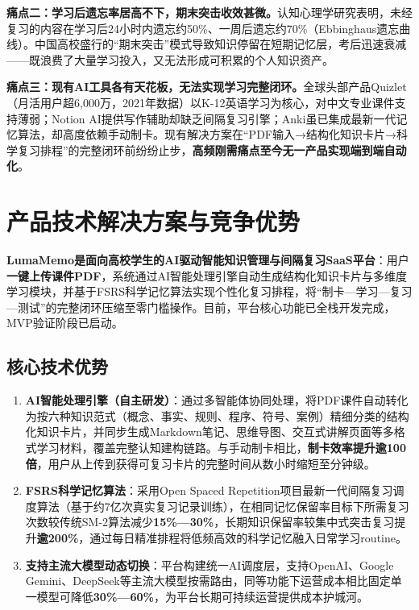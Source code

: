 \textbf{痛点二：学习后遗忘率居高不下，期末突击收效甚微。}认知心理学研究表明，未经复习的内容在学习后24小时内遗忘约50\%、一周后遗忘约70\%（Ebbinghaus遗忘曲线）。中国高校盛行的“期末突击”模式导致知识停留在短期记忆层，考后迅速衰减——既浪费了大量学习投入，又无法形成可积累的个人知识资产。

\textbf{痛点三：现有AI工具各有天花板，无法实现学习完整闭环。}全球头部产品Quizlet（月活用户超6,000万，2021年数据）以K-12英语学习为核心，对中文专业课件支持薄弱；Notion AI提供写作辅助却缺乏间隔复习引擎；Anki虽已集成最新一代记忆算法，却高度依赖手动制卡。现有解决方案在“PDF输入→结构化知识卡片→科学复习排程”的完整闭环前纷纷止步，\textbf{高频刚需痛点至今无一产品实现端到端自动化}。

\section{产品技术解决方案与竞争优势}

\textbf{LumaMemo是面向高校学生的AI驱动智能知识管理与间隔复习SaaS平台}：用户\textbf{一键上传课件PDF}，系统通过AI智能处理引擎自动生成结构化知识卡片与多维度学习模块，并基于FSRS科学记忆算法实现个性化复习排程，将“制卡—学习—复习—测试”的完整闭环压缩至零门槛操作。目前，平台核心功能已全栈开发完成，MVP验证阶段已启动。

\subsection{核心技术优势}

\begin{enumerate}[leftmargin=2em]
  \item \textbf{AI智能处理引擎（自主研发）}：通过多智能体协同处理，将PDF课件自动转化为按六种知识范式（概念、事实、规则、程序、符号、案例）精细分类的结构化知识卡片，并同步生成Markdown笔记、思维导图、交互式讲解页面等多格式学习材料，覆盖完整认知建构链路。与手动制卡相比，\textbf{制卡效率提升逾100倍}，用户从上传到获得可复习卡片的完整时间从数小时缩短至分钟级。

  \item \textbf{FSRS科学记忆算法}：采用Open Spaced Repetition项目最新一代间隔复习调度算法（基于约7亿次真实复习记录训练），在相同记忆保留率目标下所需复习次数较传统SM-2算法减少\textbf{15\%—30\%}，长期知识保留率较集中式突击复习提升\textbf{逾200\%}，通过每日精准排程将低频高效的科学记忆融入日常学习routine。

  \item \textbf{支持主流大模型动态切换}：平台构建统一AI调度层，支持OpenAI、Google Gemini、DeepSeek等主流大模型按需路由，同等功能下运营成本相比固定单一模型可降低\textbf{30\%—60\%}，为平台长期可持续运营提供成本护城河。
\end{enumerate}


